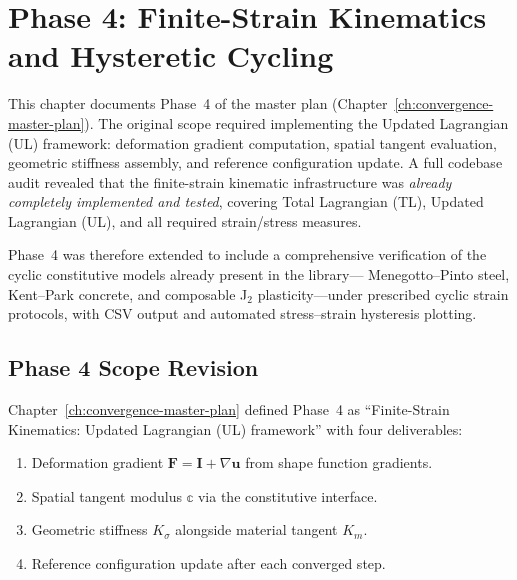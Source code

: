 
\chapter{Phase 4: Finite-Strain Kinematics and Hysteretic Cycling}
\label{ch:phase4-finite-strain-hysteretic}

This chapter documents Phase~4 of the master plan
(Chapter~\ref{ch:convergence-master-plan}).
The original scope required implementing the Updated Lagrangian (UL)
framework: deformation gradient computation, spatial tangent evaluation,
geometric stiffness assembly, and reference configuration update.
A full codebase audit revealed that the finite-strain kinematic
infrastructure was \emph{already completely implemented and tested},
covering Total Lagrangian (TL), Updated Lagrangian (UL), and all
required strain/stress measures.

Phase~4 was therefore extended to include a comprehensive verification
of the cyclic constitutive models already present in the library—%
Menegotto--Pinto steel, Kent--Park concrete, and composable J$_2$
plasticity—under prescribed cyclic strain protocols, with CSV output
and automated stress--strain hysteresis plotting.


\section{Phase 4 Scope Revision}
\label{sec:phase4-scope-revision}

Chapter~\ref{ch:convergence-master-plan} defined Phase~4 as
``Finite-Strain Kinematics: Updated Lagrangian (UL) framework'' with
four deliverables:

\begin{enumerate}
  \item Deformation gradient
        $\mathbf{F} = \mathbf{I} + \nabla\mathbf{u}$ from shape
        function gradients.\label{it:p4-F}
  \item Spatial tangent modulus $\mathbb{c}$ via the constitutive
        interface.\label{it:p4-c}
  \item Geometric stiffness
        $K_\sigma$ alongside material tangent $K_m$.\label{it:p4-Ks}
  \item Reference configuration update after each converged
        step.\label{it:p4-ref}
\end{enumerate}

